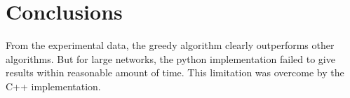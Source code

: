 



\section{Conclusions}
From the experimental data, the greedy algorithm clearly outperforms
other algorithms.
But for large networks, the python implementation
failed to give results within reasonable amount of time.
This limitation was overcome by the C++ implementation.
